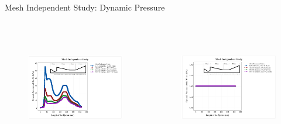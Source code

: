 \begin{frame}{Mesh Independent Study: Dynamic Pressure}
       \begin{columns}
      \begin{figure}[h]
      \centering
      \includegraphics[height=4.5cm]{images/MISdynapair.png}
      \label{fig:meshindependentstudy}
      \end{figure}
      \begin{figure}[h]
      \centering
      \includegraphics[height=4.5cm]{images/MISdynapwater.png}
      \label{fig:meshindependentstudy}
      \end{figure}
    \end{columns}
\end{frame}


